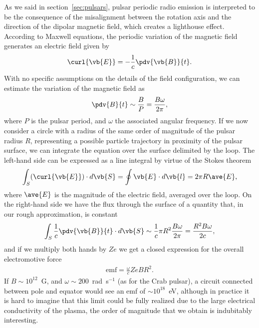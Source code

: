 As we said in section~\ref{sec:pulsars}, pulsar periodic radio emission is interpreted
to be the consequence of the misalignment between the rotation axis and the direction
of the dipolar magnetic field, which creates a lighthouse effect. According to Maxwell
equations, the periodic variation of the magnetic field generates an electric field
given by
\begin{align*}
  \curl{\vb{E}} = -\frac{1}{c}\pdv{\vb{B}}{t}.
\end{align*}
With no specific assumptions on the details of the field configuration, we can estimate
the variation of the magnetic field as
\begin{align*}
  \pdv{B}{t} \sim \frac{B}{P} = \frac{B\omega}{2\pi},
\end{align*}
where $P$ is the pulsar period, and $\omega$ the associated angular frequency.
If we now consider a circle with a radius of the same order of magnitude of the
pulsar radius $R$, representing a possible particle trajectory in proximity of the
pulsar surface, we can integrate the equation over the surface delimited by the
loop. The left-hand side can be expressed as a line integral by virtue of the
Stokes theorem
\begin{align*}
  \int_S (\curl{\vb{E}}) \cdot d\vb{S} = \oint \vb{E} \cdot d\vb{l} = 2\pi R \ave{E},
\end{align*}
where $\ave{E}$ is the magnitude of the electric field, averaged over the loop. On
the right-hand side we have the flux through the surface of a quantity that, in our
rough approximation, is constant
\begin{align*}
  \int_S \frac{1}{c}\pdv{\vb{B}}{t} \cdot d\vb{S} \sim
  \frac{1}{c} \pi R^2 \frac{B\omega}{2\pi} = \frac{R^2 B \omega}{2c},
\end{align*}
and if we multiply both hands by $Ze$ we get a closed
expression for the overall electromotive force
\begin{align}\label{eq:pulsar_emf}
  \text{emf} = \frac{\omega}{c} Ze B R^2.
\end{align}
If $B \sim 10^{12}$~G, and $\omega \sim 200$~rad~s$^{-1}$ (as for the Crab pulsar),
a circuit connected between pole and equator would see an emf of $\sim 10^{18}$~eV,
although in practice it is hard to imagine that this limit could be fully realized
due to the large electrical conductivity of the plasma, the order of magnitude that
we obtain is indubitably interesting.


